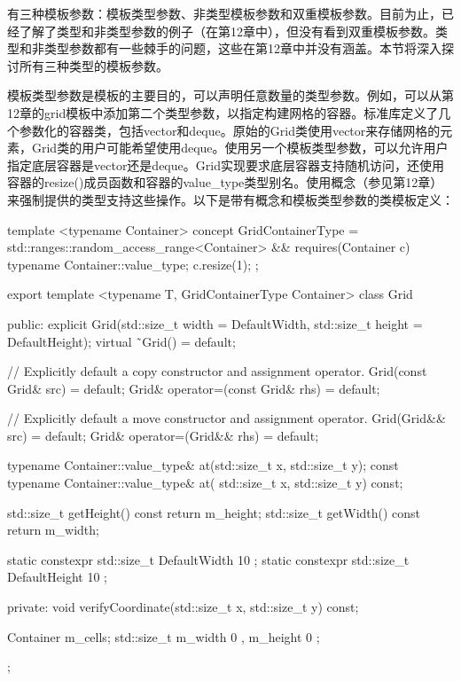 
有三种模板参数：模板类型参数、非类型模板参数和双重模板参数。目前为止，已经了解了类型和非类型参数的例子（在第12章中），但没有看到双重模板参数。类型和非类型参数都有一些棘手的问题，这些在第12章中并没有涵盖。本节将深入探讨所有三种类型的模板参数。


模板类型参数是模板的主要目的，可以声明任意数量的类型参数。例如，可以从第12章的grid模板中添加第二个类型参数，以指定构建网格的容器。标准库定义了几个参数化的容器类，包括vector和deque。原始的Grid类使用vector来存储网格的元素，Grid类的用户可能希望使用deque。使用另一个模板类型参数，可以允许用户指定底层容器是vector还是deque。Grid实现要求底层容器支持随机访问，还使用容器的resize()成员函数和容器的value\_type类型别名。使用概念（参见第12章）来强制提供的类型支持这些操作。以下是带有概念和模板类型参数的类模板定义：

\begin{cpp}
template <typename Container>
concept GridContainerType =
    std::ranges::random_access_range<Container> &&
    requires(Container c) {
        typename Container::value_type;
        c.resize(1);
    };

export template <typename T, GridContainerType Container>
class Grid
{
    public:
        explicit Grid(std::size_t width = DefaultWidth,
            std::size_t height = DefaultHeight);
        virtual ˜Grid() = default;

        // Explicitly default a copy constructor and assignment operator.
        Grid(const Grid& src) = default;
        Grid& operator=(const Grid& rhs) = default;

        // Explicitly default a move constructor and assignment operator.
        Grid(Grid&& src) = default;
        Grid& operator=(Grid&& rhs) = default;

        typename Container::value_type& at(std::size_t x, std::size_t y);
        const typename Container::value_type& at(
            std::size_t x, std::size_t y) const;

        std::size_t getHeight() const { return m_height; }
        std::size_t getWidth() const { return m_width; }

        static constexpr std::size_t DefaultWidth { 10 };
        static constexpr std::size_t DefaultHeight { 10 };

    private:
        void verifyCoordinate(std::size_t x, std::size_t y) const;

        Container m_cells;
        std::size_t m_width { 0 }, m_height { 0 };
};
\end{cpp}

